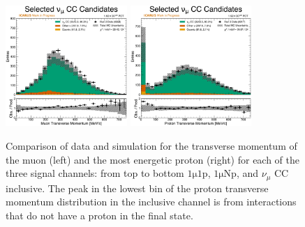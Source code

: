 \begin{figure}
    \\
    \includegraphics[width=0.41\textwidth]{figures/data_mc_comparisons/datamc_hist1d_1muX_muon_pt.pdf}
    \includegraphics[width=0.41\textwidth]{figures/data_mc_comparisons/datamc_hist1d_1muX_proton_pt.pdf}
    \caption{Comparison of data and simulation for the transverse momentum of the muon (left) and the most energetic proton (right) for each of the three signal channels: from top to bottom $\mathrm{1\mu 1p}$, $\mathrm{1\mu Np}$, and $\nu_\mu$ CC inclusive. The peak in the lowest bin of the proton transverse momentum distribution in the inclusive channel is from interactions that do not have a proton in the final state.}
    \label{fig:datamc_muon_proton_pt}
\end{figure}

